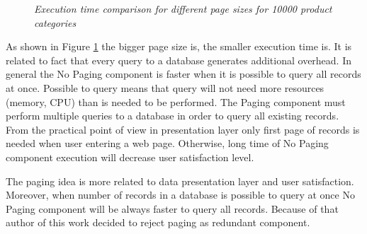 \documentclass[10pt,a4paper]{article}
\begin{document}
\begin{figure}[!htb]
\centering
{}

\caption{\textit{Execution time comparison for different page sizes for 10000 product categories}} \label{fig:pagesizetime}

\end{figure}

As shown in Figure \ref{fig:pagesizetime} the bigger page size is, the smaller execution time is. It is related to fact that every query to a database generates additional overhead. 
In general the No Paging component is faster when it is possible to query all records at once. Possible to query means that query will not need more resources (memory, CPU) than is needed to be performed. 
The Paging component must perform multiple queries to a database in order to query all existing records. From the practical point of view in presentation layer only first page of records is needed when user entering a web page. Otherwise, long time of No Paging component execution will decrease user satisfaction level.  

The paging idea is more related to data presentation layer and user satisfaction. Moreover, when number of records in a database is possible to query at once No Paging component will be always faster to query all records. Because of that author of this work decided to reject paging as redundant component. 
\end{document}
